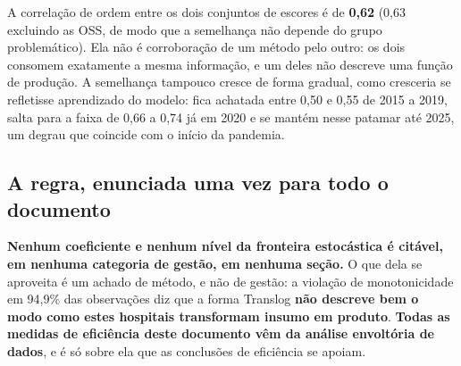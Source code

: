 
A correlação de ordem entre os dois conjuntos de escores é de
\textbf{0,62} (0,63 excluindo as OSS, de modo que a semelhança não
depende do grupo problemático). Ela não é corroboração de um método pelo
outro: os dois consomem exatamente a mesma informação, e um deles não
descreve uma função de produção. A semelhança tampouco cresce de forma
gradual, como cresceria se refletisse aprendizado do modelo: fica
achatada entre 0,50 e 0,55 de 2015 a 2019, salta para a faixa de 0,66 a
0,74 já em 2020 e se mantém nesse patamar até 2025, um degrau que
coincide com o início da pandemia.

\subsection*{A regra, enunciada uma vez para todo o documento}

\textbf{Nenhum coeficiente e nenhum nível da fronteira estocástica é
citável, em nenhuma categoria de gestão, em nenhuma seção.} O que dela se
aproveita é um achado de método, e não de gestão: a violação de
monotonicidade em 94,9\% das observações diz que a forma Translog
\textbf{não descreve bem o modo como estes hospitais transformam insumo
em produto}. \textbf{Todas as medidas de eficiência deste documento vêm
da análise envoltória de dados}, e é só sobre ela que as conclusões de
eficiência se apoiam.
